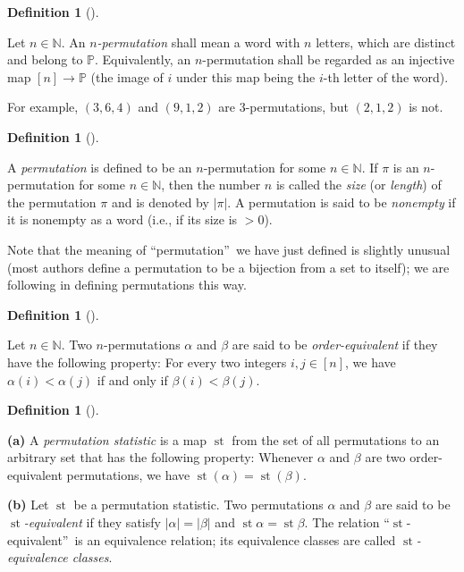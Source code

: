 \documentclass[numbers=enddot,12pt,final,onecolumn,notitlepage]{scrartcl}%
\theoremstyle{definition}
\newtheorem{defi}[theo]{Definition}
\newenvironment{definition}[1][]
{\begin{defi}[#1]\begin{leftbar}}
{\end{leftbar}\end{defi}}
\begin{document}
\begin{definition}
\label{def.perm}Let $n\in\mathbb{N}$. An $n$\textit{-permutation} shall mean a
word with $n$ letters, which are distinct and belong to $\mathbb{P}$.
Equivalently, an $n$-permutation shall be regarded as an injective map
$\left[  n\right]  \rightarrow\mathbb{P}$ (the image of $i$ under this map
being the $i$-th letter of the word).
\end{definition}

For example, $\left(  3,6,4\right)  $ and $\left(  9,1,2\right)  $ are
$3$-permutations, but $\left(  2,1,2\right)  $ is not.

\begin{definition}
A \textit{permutation} is defined to be an $n$-permutation for some
$n\in\mathbb{N}$. If $\pi$ is an $n$-permutation for some $n\in\mathbb{N}$,
then the number $n$ is called the \textit{size} (or \textit{length}) of the
permutation $\pi$ and is denoted by $\left\vert \pi\right\vert $. A
permutation is said to be \textit{nonempty} if it is nonempty as a word (i.e.,
if its size is $>0$).
\end{definition}

Note that the meaning of \textquotedblleft permutation\textquotedblright\ we
have just defined is slightly unusual (most authors define a permutation to be
a bijection from a set to itself); we are following \cite{part1} in defining
permutations this way.

\begin{definition}
Let $n\in\mathbb{N}$. Two $n$-permutations $\alpha$ and $\beta$ are said to be
\textit{order-equivalent} if they have the following property: For every two
integers $i,j\in\left[  n\right]  $, we have $\alpha\left(  i\right)
<\alpha\left(  j\right)  $ if and only if $\beta\left(  i\right)
<\beta\left(  j\right)  $.
\end{definition}

\begin{definition}
\textbf{(a)} A \textit{permutation statistic} is a map $\operatorname*{st}$
from the set of all permutations to an arbitrary set that has the following
property: Whenever $\alpha$ and $\beta$ are two order-equivalent permutations,
we have $\operatorname*{st}\left(  \alpha\right)  =\operatorname*{st}\left(
\beta\right)  $.

\textbf{(b)} Let $\operatorname*{st}$ be a permutation statistic. Two
permutations $\alpha$ and $\beta$ are said to be $\operatorname*{st}%
$\textit{-equivalent} if they satisfy $\left\vert \alpha\right\vert
=\left\vert \beta\right\vert $ and $\operatorname*{st}\alpha
=\operatorname*{st}\beta$. The relation \textquotedblleft$\operatorname*{st}%
$-equivalent\textquotedblright\ is an equivalence relation; its equivalence
classes are called $\operatorname*{st}$\textit{-equivalence classes}.
\end{definition}
\end{document}
